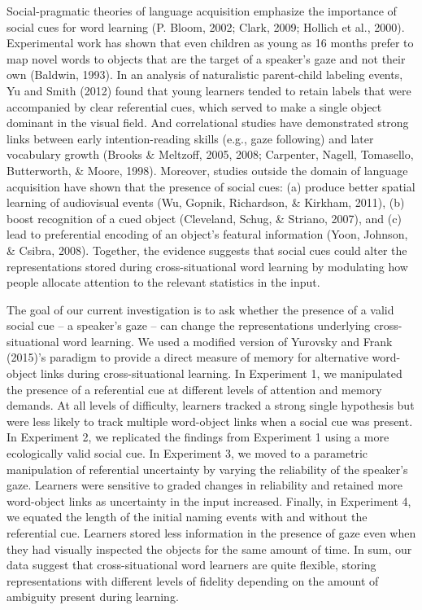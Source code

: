 \documentclass[authoryear, review]{elsarticle}
\begin{document}
Social-pragmatic theories of language acquisition emphasize the
importance of social cues for word learning (P. Bloom, 2002; Clark,
2009; Hollich et al., 2000). Experimental work has shown that even
children as young as 16 months prefer to map novel words to objects that
are the target of a speaker's gaze and not their own (Baldwin, 1993). In
an analysis of naturalistic parent-child labeling events, Yu and Smith
(2012) found that young learners tended to retain labels that were
accompanied by clear referential cues, which served to make a single
object dominant in the visual field. And correlational studies have
demonstrated strong links between early intention-reading skills (e.g.,
gaze following) and later vocabulary growth (Brooks \& Meltzoff, 2005,
2008; Carpenter, Nagell, Tomasello, Butterworth, \& Moore, 1998).
Moreover, studies outside the domain of language acquisition have shown
that the presence of social cues: (a) produce better spatial learning of
audiovisual events (Wu, Gopnik, Richardson, \& Kirkham, 2011), (b) boost
recognition of a cued object (Cleveland, Schug, \& Striano, 2007), and
(c) lead to preferential encoding of an object's featural information
(Yoon, Johnson, \& Csibra, 2008). Together, the evidence suggests that
social cues could alter the representations stored during
cross-situational word learning by modulating how people allocate
attention to the relevant statistics in the input.

The goal of our current investigation is to ask whether the presence of
a valid social cue -- a speaker's gaze -- can change the representations
underlying cross-situational word learning. We used a modified version
of Yurovsky and Frank (2015)'s paradigm to provide a direct measure of
memory for alternative word-object links during cross-situational
learning. In Experiment 1, we manipulated the presence of a referential
cue at different levels of attention and memory demands. At all levels
of difficulty, learners tracked a strong single hypothesis but were less
likely to track multiple word-object links when a social cue was
present. In Experiment 2, we replicated the findings from Experiment 1
using a more ecologically valid social cue. In Experiment 3, we moved to
a parametric manipulation of referential uncertainty by varying the
reliability of the speaker's gaze. Learners were sensitive to graded
changes in reliability and retained more word-object links as
uncertainty in the input increased. Finally, in Experiment 4, we equated
the length of the initial naming events with and without the referential
cue. Learners stored less information in the presence of gaze even when
they had visually inspected the objects for the same amount of time. In
sum, our data suggest that cross-situational word learners are quite
flexible, storing representations with different levels of fidelity
depending on the amount of ambiguity present during learning.
\end{document}
